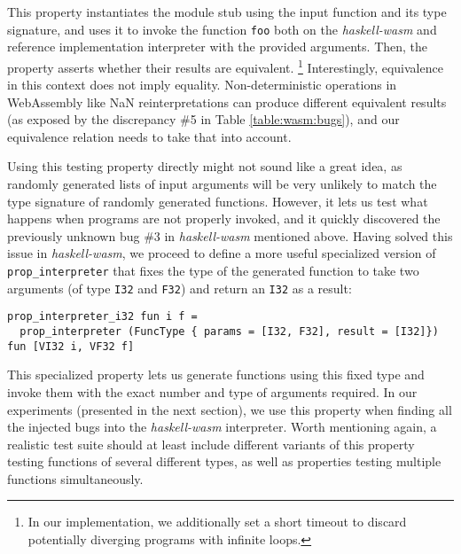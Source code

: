 \documentclass[sigconf, anonymous]{acmart}
\newcommand{\mutagen}{\textsc{Mutagen}\xspace}
\begin{document}
This property instantiates the module stub using the input function and its type
signature, and uses it to invoke the function \texttt{foo} both on the
\textit{haskell-wasm} and reference implementation interpreter with the provided
arguments.
%
Then, the property asserts whether their results are equivalent.%
%
\footnote{In our implementation, we additionally set a short timeout to discard
  potentially diverging programs with infinite loops.}
%
Interestingly, equivalence in this context does not imply equality.
%
Non-deterministic operations in WebAssembly like NaN reinterpretations can
produce different equivalent results (as exposed by the discrepancy \#5 in Table
\ref{table:wasm:bugs}), and our equivalence relation needs to take that into
account.
%


Using this testing property directly might not sound like a great idea, as
randomly generated lists of input arguments will be very unlikely to match the
type signature of randomly generated functions.
%
However, it lets us test what happens when programs are not properly invoked,
and it quickly discovered the previously unknown bug \#3 in
\textit{haskell-wasm} mentioned above.
%
Having solved this issue in \textit{haskell-wasm}, we proceed to define a more
useful specialized version of \texttt{prop\_interpreter} that fixes the type of
the generated function to take two arguments (of type \texttt{I32} and
\texttt{F32}) and return an \texttt{I32} as a result:

\begin{verbatim}
prop_interpreter_i32 fun i f =
  prop_interpreter (FuncType { params = [I32, F32], result = [I32]}) fun [VI32 i, VF32 f]
\end{verbatim}

This specialized property lets us generate functions using this fixed type and
invoke them with the exact number and type of arguments required.
%
In our experiments (presented in the next section), we use this property when
finding all the injected bugs into the \textit{haskell-wasm} interpreter.
%
Worth mentioning again, a realistic test suite should at least include different
variants of this property testing functions of several different types, as well
as properties testing multiple functions simultaneously.

\end{document}

